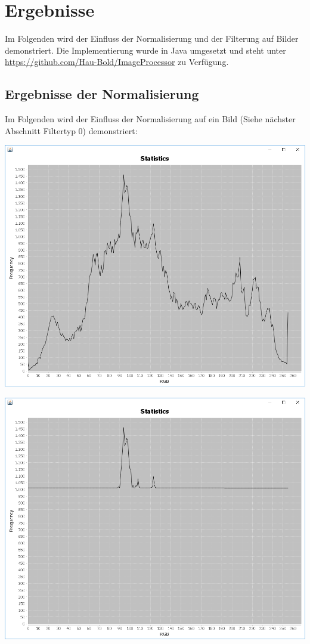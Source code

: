 \documentclass[a4paper,12pt]{article}
\begin{document}
\section{Ergebnisse}
Im Folgenden wird der Einfluss der Normalisierung und der Filterung auf Bilder demonstriert.
Die Implementierung wurde in Java umgesetzt und steht unter \url{https://github.com/Hau-Bold/ImageProcessor} zu Verfügung.
\subsection{Ergebnisse der Normalisierung}
Im Folgenden wird der Einfluss der Normalisierung auf ein Bild (Siehe nächster Abschnitt Filtertyp 0) demonstriert:
\par
\begin{center}
\includegraphics[width=0.8\linewidth,height=0.7\textheight]{Normalization/lena_unnormalized}
\end{center}
\begin{center}
\includegraphics[width=0.8\linewidth,height=0.7\textheight]{Normalization/lena_normalized}
\end{center}
\end{document}
